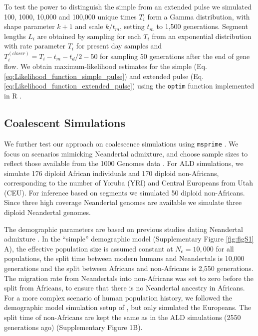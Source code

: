 \documentclass[11pt]{article}
\begin{document}
To test the power to distinguish the simple from an extended pulse we simulated 100, 1000, 10,000 and 100,000 unique times $T_i$ form a Gamma distribution, with shape parameter $k+1$ and scale  $k/t_m$, setting $t_m$ to 1,500 generations.  Segment lengths $L_i$ are obtained by sampling for each $T_i$ from an exponential distribution  with rate parameter $T_i$ for present day samples and $T_i^{(closer)}= T_i - t_m - t_d/2 - 50$ for sampling 50 generations after the end of gene flow. We obtain maximum-likelihood estimates for the simple (Eq. \ref{eq:Likelihood_function_simple_pulse}) and extended pulse (Eq. \ref{eq:Likelihood_function_extended_pulse}) using the \texttt{optim} function implemented in R \citep{R_Core_Team_2019}.

\subsection{Coalescent Simulations}\label{coalescent simulations}

We further test our approach on coalescence simulations using  \texttt{msprime} 
\citep{kelleher_efficient_2016}. We focus on scenarios mimicking Neandertal admixture, and choose sample sizes to reflect those available from the 1000 Genomes data \citep{the_1000_genomes_project_consortium_global_2015}. For ALD simulations, we simulate 176 diploid
African individuals and 170 diploid non-Africans, corresponding to the
number of Yoruba (YRI) and Central Europeans from Utah (CEU). For inference based on segments we simulated 50 diploid non-Africans.
Since three high coverage Neandertal genomes are available \citep{prufer_complete_2013,prufer_high-coverage_2017,mafessoni_high_coverage_2020} we  simulate three diploid Neandertal genomes. 

The demographic parameters are based on
previous studies dating Neandertal admixture
\citep{sankararaman_date_2012,fu_genome_2014,moorjani_genetic_2016,skov_detecting_2018}. In
the ``simple'' demographic model (Supplementary Figure  \ref{fig:figS1} A), the effective
population size is assumed constant at $N_e=10,000$ for all populations, the
split time between modern humans and Neandertals is 10,000 generations
and the split between Africans and non-Africans is 2,550
generations. The migration rate from Neandertals into non-Africans
was set to zero before the split from Africans, to ensure that there is no Neandertal
ancestry in Africans.  For a more complex scenario of human population history, we followed the demographic model simulation setup of \cite{skov_detecting_2018}, but only simulated the Europeans. The split time of  non-Africans are kept the same as in the ALD simulations (2550 generations ago) (Supplementary Figure 1B). 
\end{document}
